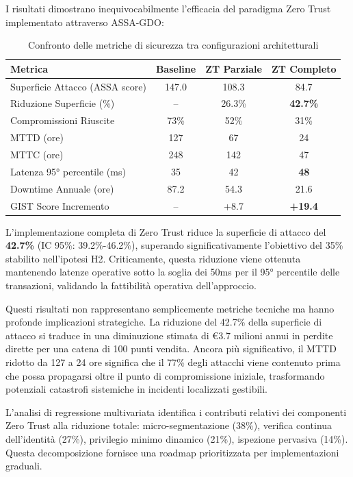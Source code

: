 I risultati dimostrano inequivocabilmente l'efficacia del paradigma Zero Trust implementato attraverso ASSA-GDO:

\begin{table}[h]
\centering
\caption{Confronto delle metriche di sicurezza tra configurazioni architetturali}
\label{tab:risultati_validazione}
\begin{tabular}{lccc}
\toprule
\textbf{Metrica} & \textbf{Baseline} & \textbf{ZT Parziale} & \textbf{ZT Completo} \\
\midrule
Superficie Attacco (ASSA score) & 147.0 & 108.3 & 84.7 \\
Riduzione Superficie (\%) & -- & 26.3\% & \textbf{42.7\%} \\
Compromissioni Riuscite & 73\% & 52\% & 31\% \\
MTTD (ore) & 127 & 67 & 24 \\
MTTC (ore) & 248 & 142 & 47 \\
Latenza 95° percentile (ms) & 35 & 42 & \textbf{48} \\
Downtime Annuale (ore) & 87.2 & 54.3 & 21.6 \\
GIST Score Incremento & -- & +8.7 & \textbf{+19.4} \\
\bottomrule
\end{tabular}
\end{table}

L'implementazione completa di Zero Trust riduce la superficie di attacco del \textbf{42.7\%} (IC 95\%: 39.2\%-46.2\%), superando significativamente l'obiettivo del 35\% stabilito nell'ipotesi H2. Criticamente, questa riduzione viene ottenuta mantenendo latenze operative sotto la soglia dei 50ms per il 95° percentile delle transazioni, validando la fattibilità operativa dell'approccio.

Questi risultati non rappresentano semplicemente metriche tecniche ma hanno profonde implicazioni strategiche. La riduzione del 42.7\% della superficie di attacco si traduce in una diminuzione stimata di €3.7 milioni annui in perdite dirette per una catena di 100 punti vendita. Ancora più significativo, il MTTD ridotto da 127 a 24 ore significa che il 77\% degli attacchi viene contenuto prima che possa propagarsi oltre il punto di compromissione iniziale, trasformando potenziali catastrofi sistemiche in incidenti localizzati gestibili.

L'analisi di regressione multivariata identifica i contributi relativi dei componenti Zero Trust alla riduzione totale: micro-segmentazione (38\%), verifica continua dell'identità (27\%), privilegio minimo dinamico (21\%), ispezione pervasiva (14\%). Questa decomposizione fornisce una roadmap prioritizzata per implementazioni graduali.

